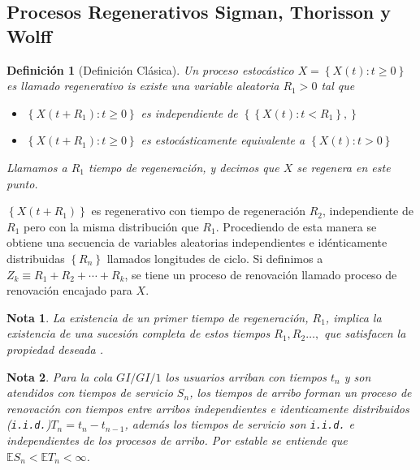 \documentclass{article}
\newtheorem{Def}{Definición}
\newtheorem{Note}{Nota}
\newcommand{\esp}{\mathbb{E}}
\begin{document}
\subsection{Procesos Regenerativos Sigman, Thorisson y Wolff \cite{Sigman2}}


\begin{Def}[Definici\'on Cl\'asica]
Un proceso estoc\'astico $X=\left\{X\left(t\right):t\geq0\right\}$ es llamado regenerativo is existe una variable aleatoria $R_{1}>0$ tal que
\begin{itemize}
\item[i)] $\left\{X\left(t+R_{1}\right):t\geq0\right\}$ es independiente de $\left\{\left\{X\left(t\right):t<R_{1}\right\},\right\}$
\item[ii)] $\left\{X\left(t+R_{1}\right):t\geq0\right\}$ es estoc\'asticamente equivalente a $\left\{X\left(t\right):t>0\right\}$
\end{itemize}

Llamamos a $R_{1}$ tiempo de regeneraci\'on, y decimos que $X$ se regenera en este punto.
\end{Def}

$\left\{X\left(t+R_{1}\right)\right\}$ es regenerativo con tiempo de regeneraci\'on $R_{2}$, independiente de $R_{1}$ pero con la misma distribuci\'on que $R_{1}$. Procediendo de esta manera se obtiene una secuencia de variables aleatorias independientes e id\'enticamente distribuidas $\left\{R_{n}\right\}$ llamados longitudes de ciclo. Si definimos a $Z_{k}\equiv R_{1}+R_{2}+\cdots+R_{k}$, se tiene un proceso de renovaci\'on llamado proceso de renovaci\'on encajado para $X$.


\begin{Note}
La existencia de un primer tiempo de regeneraci\'on, $R_{1}$, implica la existencia de una sucesi\'on completa de estos tiempos $R_{1},R_{2}\ldots,$ que satisfacen la propiedad deseada \cite{Sigman2}.
\end{Note}


\begin{Note} Para la cola $GI/GI/1$ los usuarios arriban con tiempos $t_{n}$ y son atendidos con tiempos de servicio $S_{n}$, los tiempos de arribo forman un proceso de renovaci\'on  con tiempos entre arribos independientes e identicamente distribuidos (\texttt{i.i.d.})$T_{n}=t_{n}-t_{n-1}$, adem\'as los tiempos de servicio son \texttt{i.i.d.} e independientes de los procesos de arribo. Por \textit{estable} se entiende que $\esp S_{n}<\esp T_{n}<\infty$.
\end{Note}
 
\end{document}
